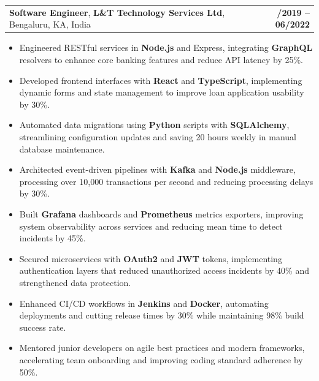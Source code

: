 \documentclass[letterpaper,11pt]{article}
\makeatletter
\newcommand{\resumeItem}[1]{
  \item\footnotesize{
    {#1 \vspace{-2pt}}
  }
}
\newcommand{\resumeSubheading}[4]{
  \vspace{-2pt}\item
    \begin{tabular*}{1.0\textwidth}[t]{l@{\extracolsep{\fill}}r}
      \textbf{\fontsize{10pt}{14pt}\selectfont #3}, \textbf{\fontsize{10pt}{14pt}\selectfont #1}, \fontsize{10pt}{14pt}\selectfont #4 & \textbf{\fontsize{10pt}{14pt}\selectfont #2} \\
    \end{tabular*}\vspace{-7pt}
}
\newcommand{\resumeItemListStart}{\begin{itemize}[leftmargin=*]}
\newcommand{\resumeItemListEnd}{\end{itemize}\vspace{-5pt}}
\makeatother
\begin{document}
    \resumeSubheading
        {L\&T Technology Services Ltd}{08/2019 -- 06/2022}
        {Software Engineer}{Bengaluru, KA, India}
      \resumeItemListStart
        \resumeItem{Engineered RESTful services in \textbf{Node.js} and Express, integrating \textbf{GraphQL} resolvers to enhance core banking features and reduce API latency by 25\%.}
        \resumeItem{Developed frontend interfaces with \textbf{React} and \textbf{TypeScript}, implementing dynamic forms and state management to improve loan application usability by 30\%.}
        \resumeItem{Automated data migrations using \textbf{Python} scripts with \textbf{SQLAlchemy}, streamlining configuration updates and saving 20 hours weekly in manual database maintenance.}
        \resumeItem{Architected event-driven pipelines with \textbf{Kafka} and \textbf{Node.js} middleware, processing over 10,000 transactions per second and reducing processing delays by 30\%.}
        \resumeItem{Built \textbf{Grafana} dashboards and \textbf{Prometheus} metrics exporters, improving system observability across services and reducing mean time to detect incidents by 45\%.}
        \resumeItem{Secured microservices with \textbf{OAuth2} and \textbf{JWT} tokens, implementing authentication layers that reduced unauthorized access incidents by 40\% and strengthened data protection.}
        \resumeItem{Enhanced CI/CD workflows in \textbf{Jenkins} and \textbf{Docker}, automating deployments and cutting release times by 30\% while maintaining 98\% build success rate.}
        \resumeItem{Mentored junior developers on agile best practices and modern frameworks, accelerating team onboarding and improving coding standard adherence by 50\%.}
      \resumeItemListEnd
\end{document}
